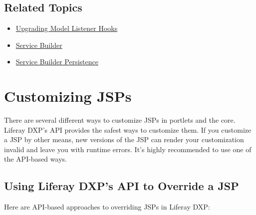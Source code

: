 \section{Related Topics}\label{related-topics-16}

\begin{itemize}
\tightlist
\item
  \href{/docs/7-2/tutorials/-/knowledge_base/t/upgrading-model-listener-hooks}{Upgrading
  Model Listener Hooks}
\item
  \href{/docs/7-2/appdev/-/knowledge_base/a/service-builder}{Service
  Builder}
\item
  \href{/docs/7-2/appdev/-/knowledge_base/a/service-builder}{Service
  Builder Persistence}
\end{itemize}

\chapter{Customizing JSPs}\label{customizing-jsps}

There are several different ways to customize JSPs in portlets and the
core. Liferay DXP's API provides the safest ways to customize them. If
you customize a JSP by other means, new versions of the JSP can render
your customization invalid and leave you with runtime errors. It's
highly recommended to use one of the API-based ways.

\section{Using Liferay DXP's API to Override a
JSP}\label{using-liferay-dxps-api-to-override-a-jsp}

Here are API-based approaches to overriding JSPs in Liferay DXP:

